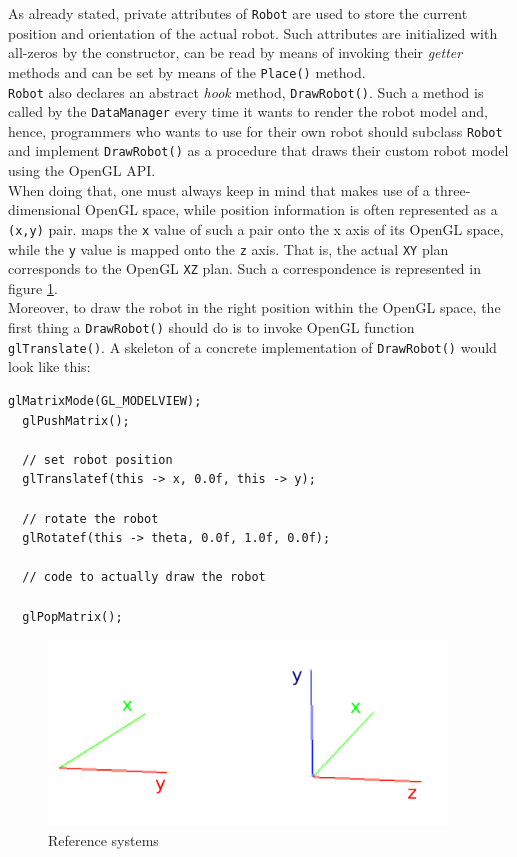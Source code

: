 As already stated, private attributes of \texttt{Robot} 
are used to store the current position and orientation 
of the actual robot. Such attributes are initialized with 
all-zeros by the constructor, can be read by means 
of invoking their \textit{getter} methods and can be set 
by means of the \texttt{Place()} method.
\\
\texttt{Robot} also declares an abstract \textit{hook} method, 
\texttt{DrawRobot()}. Such a method is called by the 
\texttt{DataManager} every time it wants to render the 
robot model and, hence, programmers who wants to 
use \framework{} for their own robot should subclass 
\texttt{Robot} and implement \texttt{DrawRobot()} as a 
procedure that draws their custom robot model using 
the OpenGL API.
\\
When doing that, one must always keep in mind that 
\framework{} makes use of a three-dimensional OpenGL 
space, while position information is often represented 
as a \texttt{(x,y)} pair. \framework{} maps the \texttt{x} 
value of such a pair onto the x axis of its OpenGL space, 
while the \texttt{y} value is mapped onto the \texttt{z} axis.
That is, the actual \texttt{XY} plan corresponds to the OpenGL 
\texttt{XZ} plan. Such a correspondence is represented in figure 
\ref{fig:reference_systems}.
\\
Moreover, to draw the robot in the right position within 
the OpenGL space, the first thing a \texttt{DrawRobot()} should 
do is to invoke OpenGL function \texttt{glTranslate()}.
A skeleton of a concrete implementation of \texttt{DrawRobot()}
would look like this:
\\
\begin{lstlisting}[caption={\texttt{DrawRobot()} skeleton}, label={code:drawrobot_skeleton}]  
  glMatrixMode(GL_MODELVIEW);
  glPushMatrix();

  // set robot position
  glTranslatef(this -> x, 0.0f, this -> y);

  // rotate the robot 
  glRotatef(this -> theta, 0.0f, 1.0f, 0.0f);

  // code to actually draw the robot

  glPopMatrix();
\end{lstlisting}

\begin{figure}[!h]
  \begin{center}
    \includegraphics[width=300pt]{img/reference_system.png}
    \caption{Reference systems}
    \label{fig:reference_systems}
  \end{center}
\end{figure}


